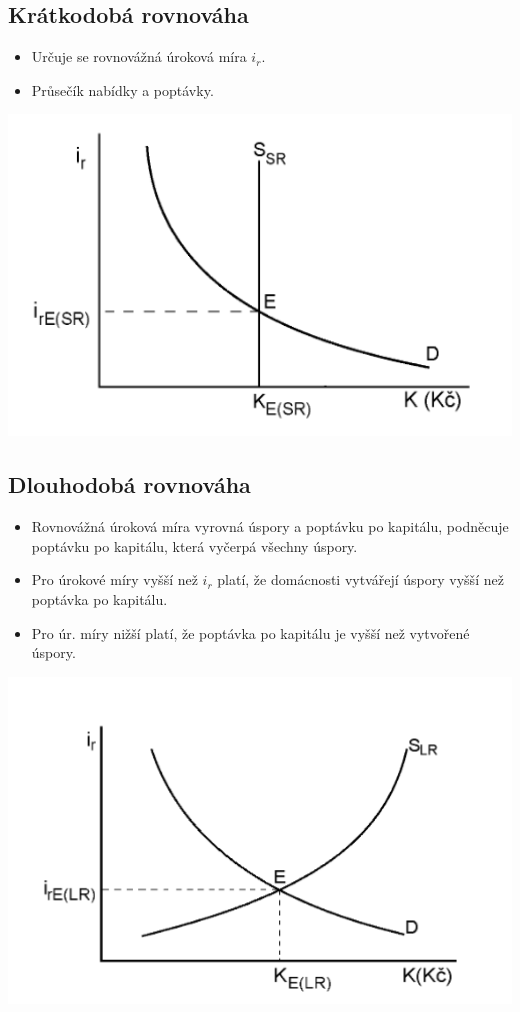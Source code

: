 \subsection{Krátkodobá rovnováha}
\begin{itemize}
    \item Určuje se rovnovážná úroková míra $i_r$.
    \item Průsečík nabídky a poptávky.
\end{itemize}
\includegraphics[width=16cm]{images/18_kratkodoba_rovnovaha.png}

\subsection{Dlouhodobá rovnováha}
\begin{itemize}
    \item Rovnovážná úroková míra vyrovná úspory a poptávku po kapitálu, podněcuje poptávku po kapitálu,
    která vyčerpá všechny úspory.
    \item Pro úrokové míry vyšší než $i_r$ platí, že domácnosti vytvářejí úspory vyšší než poptávka 
    po kapitálu.
    \item Pro úr. míry nižší platí, že poptávka po kapitálu je vyšší než vytvořené úspory.
\end{itemize}
\includegraphics[width=16cm]{images/18_dlouhodoba_rovnovaha.png}

